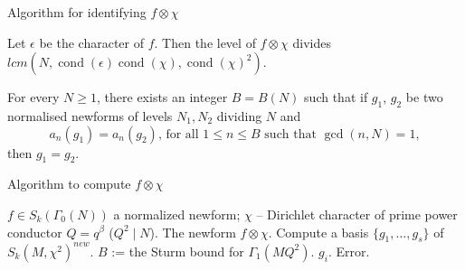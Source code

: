 \documentclass[handout]{beamer}
\DeclareMathOperator{\cond}{cond}
\begin{document}
\iffalse
\begin{frame}{Idea of computing}

Let $S_c' = \abcd{1}{\frac{1}{c'}}{0}{1}$ and $A_c' = \abcd{1}{0}{c'}{1}$.  Then 
\[
	A_c^{-u} = W_N S_{c'}^u W_N, \, \forall u \in \bZ. 
\]
For a character $\chi$ modulo $c'$, put 

$f|R_\chi(\cond \chi) = g(\bar{\chi})f_\chi$. ($f_\chi (q) = \sum a_n(f) \chi(n)  q^n$ is a modular form of level $N'$.)   We have \begin{equation} 
\label{formula}
	\varphi(c') A_c^{-a} = \sum_{\cond(\chi) \mid c'} \chi(a) W_N R_\chi(c') W_N. 
\end{equation}

Applying to $f$, we arrive at

\end{frame}
\fi

\begin{frame}{Algorithm for identifying $f \otimes \chi$}

\begin{Lemma}
Let $\epsilon$ be the character of $f$. Then the level of $f \otimes \chi$ divides $lcm(N, \cond(\epsilon) \cond(\chi), \cond(\chi)^2)$. 
\end{Lemma}

\begin{Lemma}
For every $N \geq 1$, there exists an integer $B = B(N)$ such that if $g_1$, $g_2$ be two normalised newforms of levels $N_1,N_2$ dividing $N$ and 
\[
	a_n(g_1) = a_n(g_2), \, \mbox{for all }1 \leq n \leq B \mbox{ such that } \gcd(n,N) = 1,
\]
then $g_1 = g_2$.
\end{Lemma}

\end{frame}

\begin{frame}{Algorithm to compute $f \otimes \chi$}
\begin{algorithm}[H]
\caption{Identifying  $f \otimes \chi$}
\label{alg: twist}
\begin{algorithmic}
    \Require $f \in S_k(\Gamma_0(N))$ a normalized newform; 
     $\chi$ -- Dirichlet character of prime power conductor $Q = q^\beta$ ($Q^2 \mid N$). 
    \Ensure The newform $f \otimes \chi$. 
	\State Compute a basis $\{g_1, \ldots, g_s\}$ of $S_k(M, \chi^2)^{new}$. 
    	\State $B$ := the Sturm bound for $\Gamma_1(MQ^2)$. 
			\State \Return $g_i$.
		\EndIf
	\EndFor
   \EndFor
   \State \Return Error.
\end{algorithmic}
\end{algorithm}
\end{frame}
\end{document}
